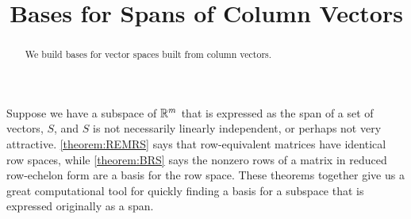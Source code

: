 \documentclass{ximera}
\title{Bases for Spans of Column Vectors}
\begin{document}
\begin{abstract}
  We build bases for vector spaces built from column vectors.
\end{abstract}
\maketitle

Suppose we have a subspace of $\mathbb{R}^{m}$ that is expressed as the span
of a set of vectors, $S$, and $S$ is not necessarily linearly
independent, or perhaps not very attractive.  \ref{theorem:REMRS} says
that row-equivalent matrices have identical row spaces, while
\ref{theorem:BRS} says the nonzero rows of a matrix in reduced
row-echelon form are a basis for the row space.  These theorems
together give us a great computational tool for quickly finding a
basis for a subspace that is expressed originally as a span.
\end{document}
